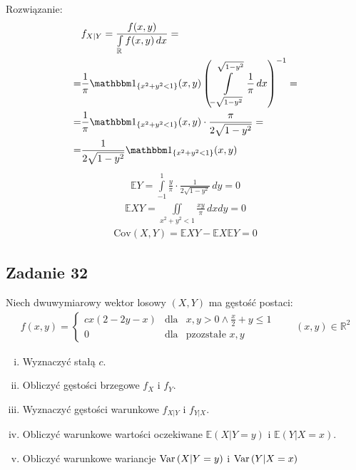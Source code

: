 Rozwiązanie:
\begin{align*}
&f_{X|Y}=\frac{f(x,y)}{\int\limits_{\mathbb R }f(x,y)\,dx}
=\\=&
\frac{1}{\pi}\mathbbm1_{\left\{x^2+y^2<1\right\}}(x,y)
\left(\int\limits_{-\sqrt{1-y^2}}^{\sqrt{1-y^2}}\frac{1}{\pi}\,dx\right)^{-1}
=\\=&
\frac{1}{\pi}\mathbbm1_{\left\{x^2+y^2<1\right\}}(x,y)\cdot
\frac{\pi}{2\sqrt{1-y^2}}
=\\=&
\frac{1}{2\sqrt{1-y^2}}\mathbbm1_{\left\{x^2+y^2<1\right\}}(x,y)
\end{align*}
\begin{align*}
\mathbb E Y=
\int\limits_{-1}^{1}\frac{y}{\pi}\cdot\frac{1}{2\sqrt{1-y^2}}\,dy=0
\end{align*}
\begin{align*}
\mathbb E XY=
\iint\limits_{x^2+y^2<1}\frac{xy}{\pi}\,dxdy=0
\end{align*}
\begin{gather*}
\text{Cov}(X,Y)=\mathbb E XY-\mathbb E X\mathbb E Y=0
\end{gather*}


\subsection*{Zadanie 32}
Niech dwuwymiarowy wektor losowy $ (X,Y) $ ma gęstość postaci:
\begin{gather*}
f(x,y)=\left \{
\begin{array}{cll}
	cx(2-2y-x) & \text{dla} & x,y>0\wedge \tfrac{x}{2}+y\le 1 \\
	0          & \text{dla} & \text{pzozstałe }x,y
\end{array}
\right .
\qquad (x,y)\in \mathbb R ^2
\end{gather*}
\begin{enumerate}[(i)]
\item Wyznaczyć stałą $ c $.
\item Obliczyć gęstości brzegowe $ f_X $ i $ f_Y $.
\item Wyznaczyć gęstości warunkowe $ f_{X|Y} $ i $ f_{Y|X} $.
\item Obliczyć warunkowe wartości oczekiwane $ \mathbb E \left(X|Y=y\right) $ i $ \mathbb E \left(Y|X=x\right) $.
\item Obliczyć warunkowe wariancje $ \text{Var} \left(X|Y=y\right) $ i $ \text{Var} \left(Y|X=x\right) $
\end{enumerate}

